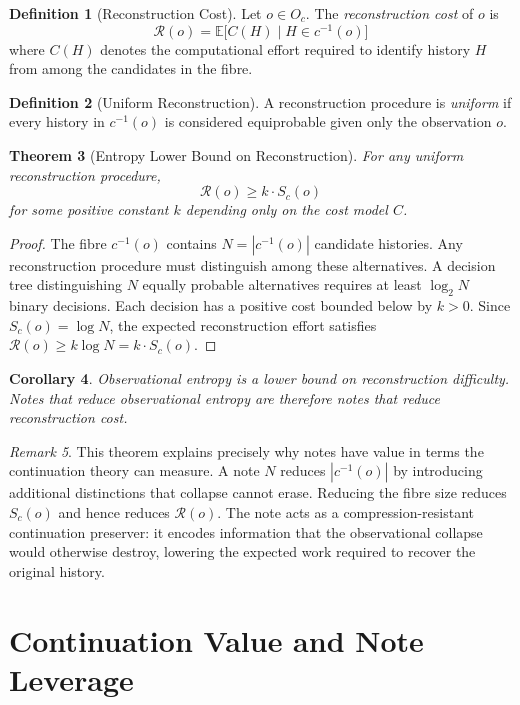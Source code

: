 \documentclass[12pt, a4paper, openany]{book}
\theoremstyle{plain}
\newtheorem{theorem}{Theorem}[chapter]
\newtheorem{corollary}[theorem]{Corollary}
\theoremstyle{definition}
\newtheorem{definition}[theorem]{Definition}
\theoremstyle{remark}
\newtheorem{remark}[theorem]{Remark}
\newcommand{\calR}{\mathcal{R}}
\begin{document}
\begin{definition}[Reconstruction Cost]
Let $o \in O_c$. The \emph{reconstruction cost} of $o$ is
\[
\calR(o) = \mathbb{E}\bigl[C(H) \mid H \in c^{-1}(o)\bigr]
\]
where $C(H)$ denotes the computational effort required to identify history $H$
from among the candidates in the fibre.
\end{definition}

\begin{definition}[Uniform Reconstruction]
A reconstruction procedure is \emph{uniform} if every history in $c^{-1}(o)$
is considered equiprobable given only the observation $o$.
\end{definition}

\begin{theorem}[Entropy Lower Bound on Reconstruction]
For any uniform reconstruction procedure,
\[
\calR(o) \geq k \cdot S_c(o)
\]
for some positive constant $k$ depending only on the cost model $C$.
\end{theorem}

\begin{proof}
The fibre $c^{-1}(o)$ contains $N = |c^{-1}(o)|$ candidate histories. Any
reconstruction procedure must distinguish among these alternatives. A decision
tree distinguishing $N$ equally probable alternatives requires at least $\log_2 N$
binary decisions. Each decision has a positive cost bounded below by $k > 0$.
Since $S_c(o) = \log N$, the expected reconstruction effort satisfies
$\calR(o) \geq k \log N = k \cdot S_c(o)$.
\end{proof}

\begin{corollary}
Observational entropy is a lower bound on reconstruction difficulty. Notes that
reduce observational entropy are therefore notes that reduce reconstruction cost.
\end{corollary}

\begin{remark}
This theorem explains precisely why notes have value in terms the continuation
theory can measure. A note $N$ reduces $|c^{-1}(o)|$ by introducing additional
distinctions that collapse cannot erase. Reducing the fibre size reduces $S_c(o)$
and hence reduces $\calR(o)$. The note acts as a compression-resistant continuation
preserver: it encodes information that the observational collapse would otherwise
destroy, lowering the expected work required to recover the original history.
\end{remark}

\section{Continuation Value and Note Leverage}
\end{document}
